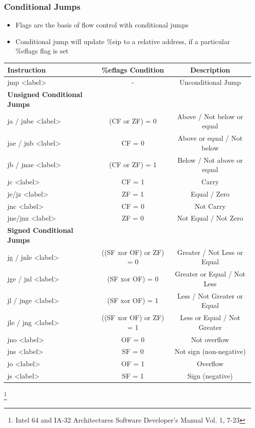 \documentclass[11pt,xcolor=dvipsnames]{beamer}
\begin{document}
\begin{frame}[fragile,t]
\frametitle{Conditional Jumps}
\begin{itemize}
  \item Flags are the basis of flow control with conditional jumps
  \item Conditional jump will update {\ttfamily \%eip} to a relative address, if a particular {\ttfamily \%eflags} flag is set
\end{itemize}
\begin{table}[h]\tiny
\begin{tabular}{l|c|c}
  \textbf{Instruction} & \textbf{\%eflags Condition} &  \textbf{Description} \\
  \hline
  {\ttfamily jmp <label>} & - & Unconditional Jump \\
  \textbf{Unsigned Conditional Jumps} & & \\
  \hline
  {\ttfamily ja / jnbe <label>} & (CF or ZF) = 0 & Above / Not below or equal \\
  {\ttfamily jae / jnb <label>} & CF = 0 & Above or equal / Not below \\
  {\ttfamily jb / jnae <label>} & (CF or ZF) = 1 & Below / Not above or equal \\
  {\ttfamily jc <label>} & CF = 1 & Carry \\
  {\ttfamily je/jz <label>} & ZF = 1 & Equal / Zero \\
  {\ttfamily jnc <label>} & CF = 0 & Not Carry \\
  {\ttfamily jne/jnz <label>} & ZF = 0 & Not Equal / Not Zero \\
  \textbf{Signed Conditional Jumps} & & \\
  \hline
  {\ttfamily jg / jnle <label>} & ((SF xor OF) or ZF) = 0 & Greater / Not Less or Equal\\
  {\ttfamily jge / jnl <label>} & (SF xor OF) = 0 & Greater or Equal / Not Less\\
  {\ttfamily jl / jnge <label>} & (SF xor OF) = 1 & Less / Not Greater or Equal \\
  {\ttfamily jle / jng <label>} & ((SF xor OF) or ZF) = 1 & Less or Equal / Not Greater \\
  {\ttfamily jno <label>} & OF = 0 & Not overflow \\
  {\ttfamily jns <label>} & SF = 0 & Not sign (non-negative) \\
  {\ttfamily jo <label>} & OF = 1 & Overflow \\
  {\ttfamily js <label>} & SF = 1 & Sign (negative) \\
\end{tabular}
\end{table} \footnote{Intel 64 and IA-32 Architectures Software Developer’s Manual Vol. 1, 7-23}
\end{frame}
\end{document}
